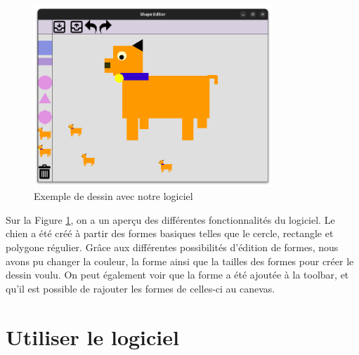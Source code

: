 \documentclass{article}
\begin{document}
\begin{figure}[h]
    \centering
    \includegraphics[width=0.8\textwidth,keepaspectratio]{dog.png}
    \caption{Exemple de dessin avec notre logiciel}
    \label{Clebs}
\end{figure}
\FloatBarrier
Sur la Figure \ref{Clebs}, on a un aperçu des différentes fonctionnalités du logiciel.
 Le chien a été créé à partir des formes basiques telles que le cercle, rectangle et polygone régulier.
 Grâce aux différentes possibilités d'édition de formes, nous avons pu changer la couleur, la forme ainsi que la tailles des formes pour créer le dessin voulu.
 On peut également voir que la forme a été ajoutée à la toolbar, et qu'il est possible de rajouter les formes de celles-ci au canevas.
 
\section{Utiliser le logiciel}
\end{document}
